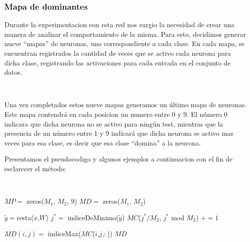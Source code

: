 \documentclass[informe.tex]{subfiles}
\begin{document}
	\subsubsection{Mapa de dominantes}
      
	Durante la experimentacion con esta red nos surgio la necesidad de crear una manera de analizar el comportamiento de la misma. Para esto, decidimos generar nueve ``mapas'' de neuronas, uno correspondiente a cada clase. En cada mapa, se encuentran registrados la cantidad de veces que se activo cada neurona para dicha clase, registrando las activaciones para cada entrada en el conjunto de datos.
	
	~
	
	Una vez completados estos nueve mapas generamos un \'ultimo mapa de neuronas. Este mapa contendr\'a en cada posicion un numero entre 0 y 9. El n\'umero 0 indicara que dicha neurona no se activo para ning\'un test, mientras que la presencia de un n\'umero entre 1 y 9 indicar\'a que dicha neurona se activo mas veces para esa clase, es decir que esa clase ``domina'' a la neurona.
	
	\newpage
	
	Presentamos el pseudocodigo y algunos ejemplos a continuacion con el fin de esclarecer el m\'etodo:
	
	~
	
	\begin{algorithmic}
	      \State $MP =$ zeros($M_1$, $M_2$, $9$)
	      \State $MD =$ zeros($M_1$, $M_2$)
	      
		\State $\tilde{y}= $resta($x$,$W$)
		\State $j^* =$ indiceDeMinimo($\tilde{y}$)
		\State $MC$($j^*/M_2$, $j^*$ mod $M_2$) $+= 1$ 
	      \EndFor
	      
		  \State $MD(i,j) =$ indiceMax($MC$($i$,$j$,$:$))
		\EndFor
	      \EndFor
	      \State \Return $MD$
	    \EndFunction
	  \end{algorithmic}
	  
	  
% 
	
\end{document}
